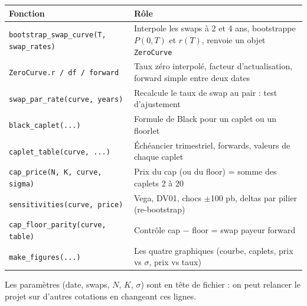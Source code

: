 \documentclass[11pt,a4paper]{article}
\begin{document}
\begin{table}[H]
\centering
\small
\begin{tabularx}{\textwidth}{>{\raggedright\arraybackslash}p{5.6cm}Y}
\toprule
Fonction & Rôle \\
\midrule
\texttt{bootstrap\_swap\_curve(T, swap\_rates)} & Interpole les swaps à 2 et 4 ans, bootstrappe $P(0,T)$ et $r(T)$, renvoie un objet \texttt{ZeroCurve} \\
\texttt{ZeroCurve.r / df / forward} & Taux zéro interpolé, facteur d'actualisation, forward simple entre deux dates \\
\texttt{swap\_par\_rate(curve, years)} & Recalcule le taux de swap au pair : test d'ajustement \\
\texttt{black\_caplet(...)} & Formule de Black pour un caplet ou un floorlet \\
\texttt{caplet\_table(curve, ...)} & Échéancier trimestriel, forwards, valeurs de chaque caplet \\
\texttt{cap\_price(N, K, curve, sigma)} & Prix du cap (ou du floor) = somme des caplets 2 à 20 \\
\texttt{sensitivities(curve, price)} & Vega, DV01, chocs $\pm$100 pb, deltas par pilier (re-bootstrap) \\
\texttt{cap\_floor\_parity(curve, table)} & Contrôle cap $-$ floor = swap payeur forward \\
\texttt{make\_figures(...)} & Les quatre graphiques (courbe, caplets, prix vs $\sigma$, prix vs taux) \\
\bottomrule
\end{tabularx}
\end{table}

Les paramètres (date, swaps, $N$, $K$, $\sigma$) sont en tête de fichier : on peut relancer le projet sur d'autres cotations en changeant ces lignes.
\end{document}
